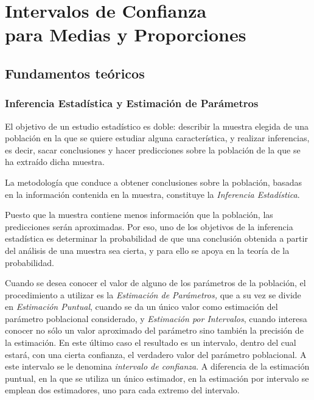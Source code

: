 
\chapter[Intervalos de Confianza para Medias y Proporciones]{Intervalos de Confianza\\ para Medias y Proporciones}

\section{Fundamentos teóricos}

\subsection{Inferencia Estadística y Estimación de Parámetros}
El objetivo de un estudio estadístico es doble: describir la muestra elegida de una población en la que se quiere
estudiar alguna característica, y realizar inferencias, es decir, sacar conclusiones y hacer predicciones sobre la
población de la que se ha extraído dicha muestra.

La metodología que conduce a obtener conclusiones sobre la población, basadas en la información contenida en la muestra,
constituye la \emph{Inferencia Estadística}.

Puesto que la muestra contiene menos información que la población, las predicciones serán aproximadas. Por eso, uno de
los objetivos de la inferencia estadística es determinar la probabilidad de que una conclusión obtenida a partir del
análisis de una muestra sea cierta, y para ello se apoya en la teoría de la probabilidad.

Cuando se desea conocer el valor de alguno de los parámetros de la población, el procedimiento a utilizar es la
\emph{Estimación de Parámetros, }que a su vez se divide en \emph{Estimación Puntual}, cuando se da un único valor como
estimación del parámetro poblacional considerado, y \emph{Estimación por Intervalos}, cuando interesa conocer no sólo un
valor aproximado del parámetro sino también la precisión de la estimación. En este último caso el resultado es un
intervalo, dentro del cual estará, con una cierta confianza, el verdadero valor del parámetro poblacional. A este
intervalo se le denomina \emph{intervalo de confianza}. A diferencia de la estimación puntual, en la que se utiliza un
único estimador, en la estimación por intervalo se emplean dos estimadores, uno para cada extremo del intervalo.

